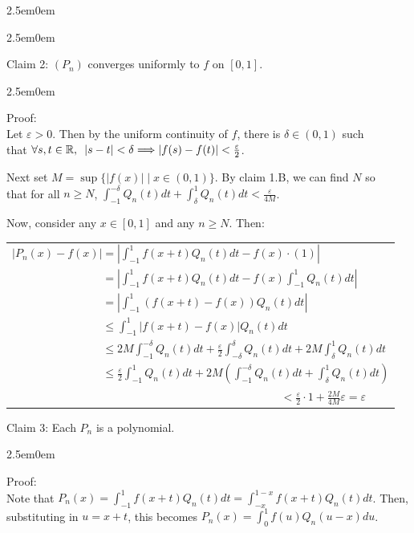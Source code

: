 \documentclass{book}
\newcommand{\hFour}{%
   \color{Cerulean}
   \fontsize{12}{14}\selectfont%
}
\newenvironment{myIndent}{%
   \begin{adjustwidth}{2.5em}{0em}%
}{%
   \end{adjustwidth}%
}
\newcommand{\myHS}{ \hspace{0.5em}}
\newcommand{\retTwo}{\hfill\bigbreak}
\begin{document}
{\begin{myIndent}
{\begin{myIndent}
      Claim 2: $(P_n)$ converges uniformly to $f$ on $[0, 1]$.
      {\begin{myIndent}\hFour
         Proof:\\
         Let $\varepsilon > 0$. Then by the uniform continuity of $f$, there is $\delta \in (0, 1)$ such\\ that $\forall s,t \in \mathbb{R},\myHS |s-t|<\delta \Longrightarrow |f(s) - f(t)| < \frac{\varepsilon}{2}$.\retTwo

         Next set $M = \sup\{|f(x)| \mid x \in (0, 1)\}$. By claim 1.B, we can find $N$ so\\ that for all $n \geq N$, $\int_{-1}^{-\delta}Q_n(t)dt + \int_\delta^1Q_n(t)dt < \frac{\varepsilon}{4M}$.\retTwo

         Now, consider any $x \in [0, 1]$ and any $n \geq N$. Then:
         
         \begin{center}
            \begin{tabular}{l}
               $|P_n(x) - f(x)| = \left|\int_{-1}^1 f(x+t)Q_n(t)dt - f(x)\cdot (1)\right|$\\ [8pt]
               $\phantom{|P_n(x) - f(x)|} = \left|\int_{-1}^1 f(x+t)Q_n(t)dt - f(x)\int_{-1}^1Q_n(t)dt\right|$\\ [8pt]
               $\phantom{|P_n(x) - f(x)|} = \left|\int_{-1}^1 (f(x+t) - f(x))Q_n(t)dt\right|$\\ [8pt]
               $\phantom{|P_n(x) - f(x)|} \leq \int_{-1}^1\left|f(x+t) - f(x)\right|Q_n(t)dt$\\ [4pt]
               $\phantom{|P_n(x) - f(x)|} \leq 2M\int_{-1}^{-\delta}Q_n(t)dt + \frac{\varepsilon}{2}\int_{-\delta}^{\delta}Q_n(t)dt + 2M\int_{\delta}^{1}Q_n(t)dt$\\ [4pt]
               $\phantom{|P_n(x) - f(x)|} \leq \frac{\varepsilon}{2}\int_{-1}^{1}Q_n(t)dt + 2M\left(\int_{-1}^{-\delta}Q_n(t)dt + \int_{\delta}^{1}Q_n(t)dt\right)$\\ [4pt]
               $\phantom{|P_n(x) - f(x)|aaaaaaaaaaaaaaaaaaaaaaaaaaaaaa} < \frac{\varepsilon}{2} \cdot 1 + \frac{2M}{4M}\varepsilon = \varepsilon$\\ [4pt]
            \end{tabular}\retTwo
         \end{center}
      \end{myIndent}}

      Claim 3: Each $P_n$ is a polynomial.
      {\begin{myIndent}\hFour
         Proof:\\
         Note that $P_n(x) = \int_{-1}^1 f(x+t)Q_n(t)dt = \int_{-x}^{1-x} f(x+t)Q_n(t)dt$. Then,\\ substituting in $u = x + t$, this becomes $P_n(x) = \int_{0}^1 f(u)Q_n(u-x)du$.


\end{myIndent}}
\end{myIndent}}
\end{myIndent}}
\end{document}
